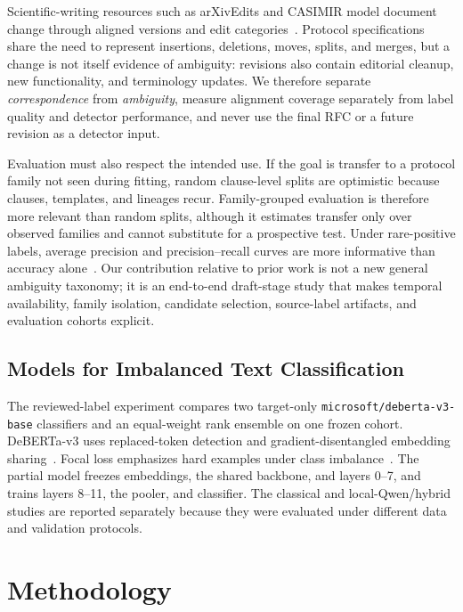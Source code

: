 \documentclass[12pt,a4paper,oneside]{report}
\begin{document}
Scientific-writing resources such as arXivEdits and CASIMIR model document change through aligned versions and edit categories~\cite{jiang2022arxivedits,tinnes2024casimir}. Protocol specifications share the need to represent insertions, deletions, moves, splits, and merges, but a change is not itself evidence of ambiguity: revisions also contain editorial cleanup, new functionality, and terminology updates. We therefore separate \emph{correspondence} from \emph{ambiguity}, measure alignment coverage separately from label quality and detector performance, and never use the final RFC or a future revision as a detector input.

Evaluation must also respect the intended use. If the goal is transfer to a protocol family not seen during fitting, random clause-level splits are optimistic because clauses, templates, and lineages recur. Family-grouped evaluation is therefore more relevant than random splits, although it estimates transfer only over observed families and cannot substitute for a prospective test. Under rare-positive labels, average precision and precision--recall curves are more informative than accuracy alone~\cite{davis2006pr,saito2015pr}. Our contribution relative to prior work is not a new general ambiguity taxonomy; it is an end-to-end draft-stage study that makes temporal availability, family isolation, candidate selection, source-label artifacts, and evaluation cohorts explicit.

\section{Models for Imbalanced Text Classification}

The reviewed-label experiment compares two target-only \texttt{microsoft/deberta-v3-base} classifiers and an equal-weight rank ensemble on one frozen cohort. DeBERTa-v3 uses replaced-token detection and gradient-disentangled embedding sharing~\cite{he2023debertav3}. Focal loss emphasizes hard examples under class imbalance~\cite{lin2017focal}. The partial model freezes embeddings, the shared backbone, and layers 0--7, and trains layers 8--11, the pooler, and classifier. The classical and local-Qwen/hybrid studies are reported separately because they were evaluated under different data and validation protocols.

\chapter{Methodology}
\end{document}
